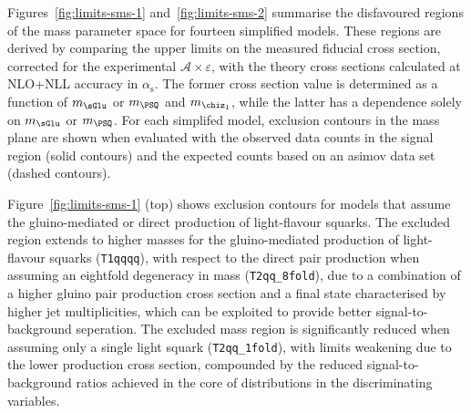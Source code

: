 Figures~\ref{fig:limits-sms-1} and~\ref{fig:limits-sms-2} summarise
the disfavoured regions of the mass parameter space for fourteen 
simplified models. These regions are derived by comparing the upper
limits on the measured fiducial cross section, corrected for the
experimental $\mathcal{A}\times\varepsilon$, with the theory cross
sections calculated at NLO+NLL accuracy in $\alpha_\text{s}$. The
former cross section value is determined as a function of $m_{\sGlu}$
or $m_{\PSQ}$ and $m_{\chiz_1}$, while the latter has a dependence
solely on $m_{\sGlu}$ or $m_{\PSQ}$. For each simplifed model,
exclusion contours in the mass plane are shown when evaluated with the
observed data counts in the signal region (solid contours) and the
expected counts based on an asimov data set (dashed contours).

Figure~\ref{fig:limits-sms-1} (top) shows exclusion contours for
models that assume the gluino-mediated or direct production of
light-flavour squarks. The excluded region extends to higher masses
for the gluino-mediated production of light-flavour squarks
(\texttt{T1qqqq}), with respect to the direct pair production when
assuming an eightfold degeneracy in mass (\texttt{T2qq\_8fold}), due
to a combination of a higher gluino pair production cross section and
a final state characterised by higher jet multiplicities, which can be
exploited to provide better signal-to-background seperation. The
excluded mass region is significantly reduced when assuming only a
single light squark (\texttt{T2qq\_1fold}), with limits weakening due
to the lower production cross section, compounded by the reduced
signal-to-background ratios achieved in the core of distributions in
the discriminating variables.


